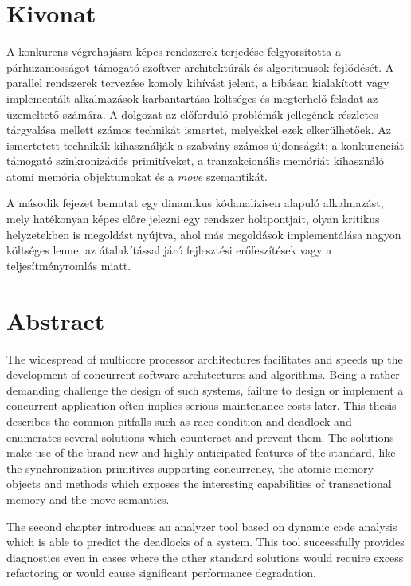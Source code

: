 \chapter*{Kivonat}

A konkurens végrehajásra képes rendszerek terjedése felgyorsította a párhuzamosságot támogató szoftver architektúrák és algoritmusok fejlődését. A parallel rendszerek tervezése komoly kihívást jelent, a hibásan kialakított vagy implementált alkalmazások karbantartása költséges és megterhelő feladat az üzemeltető számára. A dolgozat az előforduló problémák jellegének részletes tárgyalása mellett számos technikát ismertet, melyekkel ezek elkerülhetőek. Az ismertetett technikák kihasználják a \cite{C++11} szabvány számos újdonságát; a konkurenciát támogató szinkronizációs primitíveket, a tranzakcionális memóriát kihasználó atomi memória objektumokat és a \emph{move} szemantikát.

A második fejezet bemutat egy dinamikus kódanalízisen alapuló alkalmazást, mely hatékonyan képes előre jelezni egy rendszer holtpontjait, olyan kritikus helyzetekben is megoldást nyújtva, ahol más megoldások implementálása nagyon költséges lenne, az átalakítással járó fejlesztési erőfeszítések vagy a teljesítményromlás miatt.
\vfill

\chapter*{Abstract}

The widespread of multicore processor architectures facilitates and speeds up the development of concurrent software architectures and algorithms. Being a rather demanding challenge the design of such systems, failure to design or implement a concurrent application often implies serious maintenance costs later. This thesis describes the common pitfalls such as race condition and deadlock and enumerates several solutions which counteract and prevent them. The solutions make use of the brand new and highly anticipated features of the \cite{C++11} standard, like the synchronization primitives supporting concurrency, the atomic memory objects and methods which exposes the interesting capabilities of transactional memory and the move semantics.

The second chapter introduces an analyzer tool based on dynamic code analysis which is able to predict the deadlocks of a system. This tool successfully provides diagnostics even in cases where the other standard solutions would require excess refactoring or would cause significant performance degradation.
\vfill 


